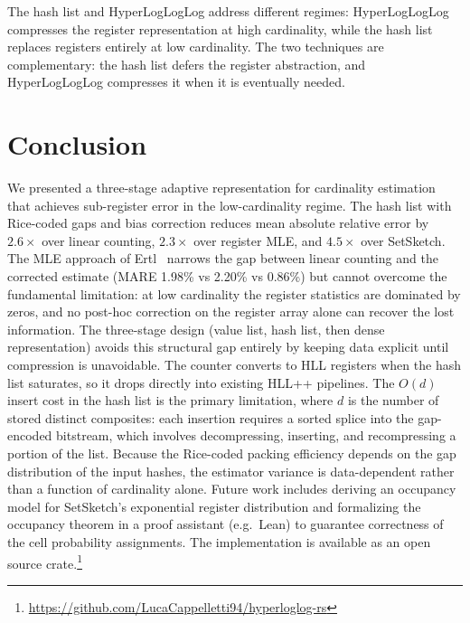 \documentclass[11pt,letterpaper]{article}
\begin{document}
The hash list and HyperLogLogLog address different
regimes: HyperLogLogLog compresses the register representation at
high cardinality, while the hash list replaces registers
entirely at low cardinality. The two techniques are complementary:
the hash list defers the register abstraction, and
HyperLogLogLog compresses it when it is eventually needed.

\section{Conclusion}

We presented a three-stage adaptive representation for cardinality
estimation that achieves sub-register error in the low-cardinality
regime. The hash list with Rice-coded gaps and
bias correction reduces mean absolute relative error by $2.6\times$
over linear counting, $2.3\times$ over register MLE, and
$4.5\times$ over SetSketch. The MLE approach of
Ertl~\cite{ertl2017probabilistic} narrows the gap between linear
counting and the corrected estimate (MARE 1.98\% vs 2.20\% vs
0.86\%) but cannot overcome the fundamental limitation: at low
cardinality the register statistics are dominated by zeros, and no
post-hoc correction on the register array alone can recover the lost
information. The three-stage design (value list, hash list, then dense
representation) avoids this structural gap entirely by keeping data
explicit until compression is unavoidable. The counter converts to HLL
registers when the hash list saturates, so it drops directly into
existing HLL++ pipelines. The $O(d)$ insert cost in
the hash list is the primary limitation, where $d$ is the number of
stored distinct composites: each insertion requires a sorted splice
into the gap-encoded bitstream, which involves decompressing,
inserting, and recompressing a portion of the list. Because the
Rice-coded packing efficiency depends on the gap distribution of the
input hashes, the estimator variance is data-dependent rather than a
function of cardinality alone. Future work includes deriving an
occupancy model for SetSketch's exponential register distribution and
formalizing the occupancy theorem in a proof assistant (e.g.\ Lean)
to guarantee correctness of the cell probability assignments. The
implementation is available as an open source
crate.\footnote{\url{https://github.com/LucaCappelletti94/hyperloglog-rs}}
\end{document}
